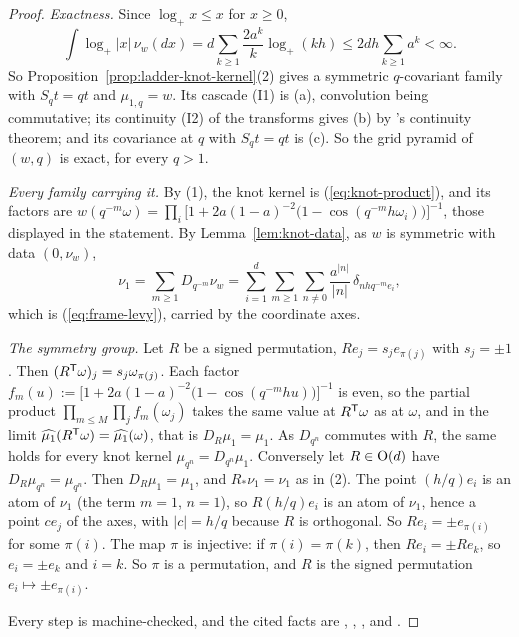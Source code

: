 \begin{proof}
\emph{Exactness.} Since $\log_+ x \le x$ for $x \ge 0$,
\[
\int\log_+|x|\,\nu_w(dx) = d\sum_{k \ge 1}\frac{2a^k}{k}\log_+(kh)
\le 2dh\sum_{k \ge 1}a^k < \infty .
\]
So Proposition~\ref{prop:ladder-knot-kernel}(2) gives a symmetric $q$-covariant family with
$S_qt = qt$ and $\mu_{1,q} = w$. Its cascade (I1) is (a), convolution being commutative; its
continuity (I2) of the transforms gives (b) by \Levy's continuity theorem; and its covariance at
$q$ with $S_qt = qt$ is (c). So the grid pyramid of $(w, q)$ is exact, for every $q > 1$.

\emph{Every family carrying it.} By (1), the knot kernel is (\ref{eq:knot-product}), and its
factors are
$\widehat{w}(q^{-m}\omega) = \prod_i\bigl[1 + 2a(1-a)^{-2}\bigl(1 - \cos(q^{-m}h\omega_i)\bigr)
\bigr]^{-1}$, those displayed in the statement. By Lemma~\ref{lem:knot-data}, as $w$ is symmetric
with data $(0, \nu_w)$,
\[
\nu_1 = \sum_{m \ge 1}D_{q^{-m}}\nu_w
= \sum_{i=1}^d\sum_{m \ge 1}\sum_{n \ne 0}\frac{a^{|n|}}{|n|}\,\delta_{nhq^{-m}e_i},
\]
which is (\ref{eq:frame-levy}), carried by the coordinate axes.

\emph{The symmetry group.} Let $R$ be a signed permutation, $Re_j = s_je_{\pi(j)}$ with
$s_j = \pm1$. Then $(R^{\mathsf{T}}\omega)_j = s_j\omega_{\pi(j)}$. Each factor
$f_m(u) := \bigl[1 + 2a(1-a)^{-2}\bigl(1 - \cos(q^{-m}hu)\bigr)\bigr]^{-1}$ is even, so the
partial product $\prod_{m \le M}\prod_jf_m(\omega_j)$ takes the same value at $R^{\mathsf{T}}\omega$ as at
$\omega$, and in the limit $\widehat{\mu_1}(R^{\mathsf{T}}\omega) = \widehat{\mu_1}(\omega)$, that is
$D_R\mu_1 = \mu_1$. As $D_{q^n}$ commutes with $R$, the same holds for every knot kernel
$\mu_{q^n} = D_{q^n}\mu_1$. Conversely let $R \in \mathrm{O}(d)$ have $D_R\mu_{q^n} = \mu_{q^n}$. Then
$D_R\mu_1 = \mu_1$, and $R_*\nu_1 = \nu_1$ as in (2). The point $(h/q)e_i$ is an atom of $\nu_1$
(the term $m = 1$, $n = 1$), so $R(h/q)e_i$ is an atom of $\nu_1$, hence a point $ce_j$ of the
axes, with $|c| = h/q$ because $R$ is orthogonal. So $Re_i = \pm e_{\pi(i)}$ for some
$\pi(i)$. The map $\pi$ is injective: if $\pi(i) = \pi(k)$, then $Re_i = \pm Re_k$, so
$e_i = \pm e_k$ and $i = k$. So $\pi$ is a permutation, and $R$ is the signed permutation
$e_i \mapsto \pm e_{\pi(i)}$.

Every step is machine-checked, and the cited facts are , , ,
 and .
\end{proof}


